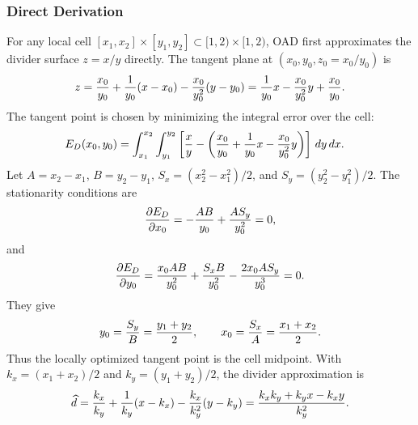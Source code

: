 \documentclass[conference]{IEEEtran}
\begin{document}
\subsubsection{Direct Derivation}
For any local cell $[x_1,x_2]\times[y_1,y_2]\subset[1,2)\times[1,2)$, OAD first
approximates the divider surface $z=x/y$ directly. The tangent plane at
$(x_0,y_0,z_0=x_0/y_0)$ is
\begin{equation}
z={x_0\over y_0}+{1\over y_0}(x-x_0)-{x_0\over y_0^2}(y-y_0)
={1\over y_0}x-{x_0\over y_0^2}y+{x_0\over y_0}.
\end{equation}
The tangent point is chosen by minimizing the integral error over the cell:
\begin{equation}
\begin{aligned}
E_D(x_0,y_0)
&=\int_{x_1}^{x_2}\int_{y_1}^{y_2}
\left[{x\over y}-\left({x_0\over y_0}+{1\over y_0}x
-{x_0\over y_0^2}y\right)\right]\,dy\,dx .
\end{aligned}
\end{equation}
Let $A=x_2-x_1$, $B=y_2-y_1$, $S_x=(x_2^2-x_1^2)/2$, and
$S_y=(y_2^2-y_1^2)/2$. The stationarity conditions are
\begin{equation}
{\partial E_D\over\partial x_0}=-{AB\over y_0}+{A S_y\over y_0^2}=0,
\end{equation}
and
\begin{equation}
{\partial E_D\over\partial y_0}=
{x_0AB\over y_0^2}+{S_xB\over y_0^2}-{2x_0A S_y\over y_0^3}=0.
\end{equation}
They give
\begin{equation}
y_0={S_y\over B}={y_1+y_2\over2},\qquad
x_0={S_x\over A}={x_1+x_2\over2}.
\end{equation}
Thus the locally optimized tangent point is the cell midpoint. With
$k_x=(x_1+x_2)/2$ and $k_y=(y_1+y_2)/2$, the divider approximation is
\begin{equation}
\widehat{d}={k_x\over k_y}+{1\over k_y}(x-k_x)-{k_x\over k_y^2}(y-k_y)
={k_xk_y+k_yx-k_xy\over k_y^2}.
\label{eq:direct_divider_plane}
\end{equation}
\end{document}
